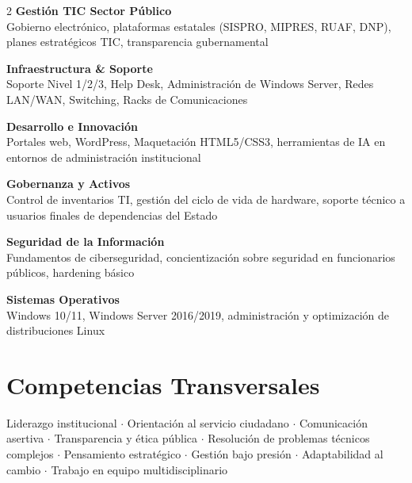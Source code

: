 \documentclass[10pt, letterpaper]{article}
\begin{document}
\begin{multicols}{2}
\noindent\textbf{\color{primary}Gestión TIC Sector Público}\\
{\small Gobierno electrónico, plataformas estatales (SISPRO, MIPRES, RUAF, DNP), planes estratégicos TIC, transparencia gubernamental}

\vspace{6pt}
\noindent\textbf{\color{primary}Infraestructura \& Soporte}\\
{\small Soporte Nivel 1/2/3, Help Desk, Administración de Windows Server, Redes LAN/WAN, Switching, Racks de Comunicaciones}

\vspace{6pt}
\noindent\textbf{\color{primary}Desarrollo e Innovación}\\
{\small Portales web, WordPress, Maquetación HTML5/CSS3, herramientas de IA en entornos de administración institucional}

\columnbreak

\noindent\textbf{\color{primary}Gobernanza y Activos}\\
{\small Control de inventarios TI, gestión del ciclo de vida de hardware, soporte técnico a usuarios finales de dependencias del Estado}

\vspace{6pt}
\noindent\textbf{\color{primary}Seguridad de la Información}\\
{\small Fundamentos de ciberseguridad, concientización sobre seguridad en funcionarios públicos, hardening básico}

\vspace{6pt}
\noindent\textbf{\color{primary}Sistemas Operativos}\\
{\small Windows 10/11, Windows Server 2016/2019, administración y optimización de distribuciones Linux}
\end{multicols}

\section*{Competencias Transversales}
\vspace{-2pt}
{\small Liderazgo institucional $\cdot$ Orientación al servicio ciudadano $\cdot$ Comunicación asertiva $\cdot$ Transparencia y ética pública $\cdot$ Resolución de problemas técnicos complejos $\cdot$ Pensamiento estratégico $\cdot$ Gestión bajo presión $\cdot$ Adaptabilidad al cambio $\cdot$ Trabajo en equipo multidisciplinario}
\end{document}
